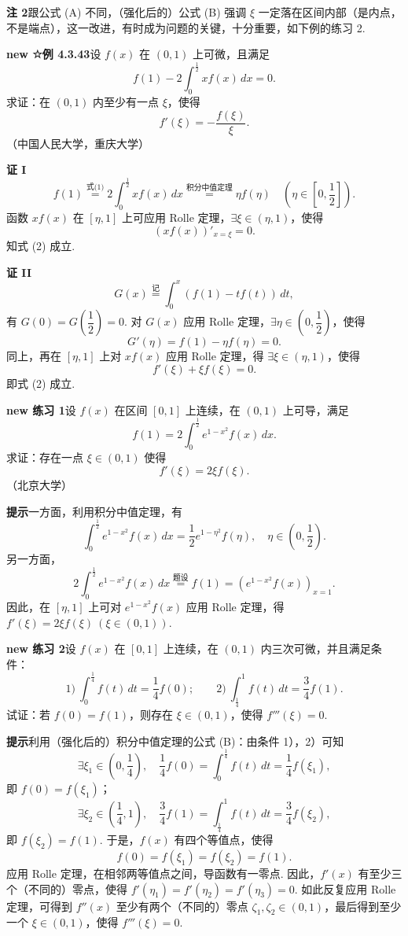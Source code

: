 \documentclass[UTF8,12pt,a4paper,fontset=fandol]{ctexart}
\begin{document}
\noindent\textbf{注 2}\quad 跟公式 (A) 不同，（强化后的）公式 (B) 强调 $\xi$ 一定落在区间内部（是内点，不是端点），这一改进，有时成为问题的关键，十分重要，如下例的练习 2.

\noindent\textbf{new ☆例 4.3.43}\quad 设 $f(x)$ 在 $(0,1)$ 上可微，且满足
\[
f(1)-2\int_0^{\frac12}xf(x)\,dx=0.
\tag{1}
\]
求证：在 $(0,1)$ 内至少有一点 $\xi$，使得
\[
f'(\xi)=-\frac{f(\xi)}{\xi}.
\tag{2}
\]
（中国人民大学，重庆大学）

\noindent\textbf{证 I}\quad
\[
f(1)\stackrel{\text{式(1)}}{=}2\int_0^{\frac12}xf(x)\,dx
\stackrel{\text{积分中值定理}}{=}\eta f(\eta)\quad
\left(\eta\in\left[0,\frac12\right]\right).
\]
函数 $xf(x)$ 在 $[\eta,1]$ 上可应用 Rolle 定理，$\exists\xi\in(\eta,1)$，使得
\[
(xf(x))'_{x=\xi}=0.
\]
知式 (2) 成立.

\noindent\textbf{证 II}\quad
\[
G(x)\stackrel{\text{记}}{=}\int_0^x(f(1)-tf(t))\,dt,
\]
有 $G(0)=G\left(\dfrac12\right)=0$. 对 $G(x)$ 应用 Rolle 定理，$\exists\eta\in\left(0,\dfrac12\right)$，使得
\[
G'(\eta)=f(1)-\eta f(\eta)=0.
\]
同上，再在 $[\eta,1]$ 上对 $xf(x)$ 应用 Rolle 定理，得 $\exists\xi\in(\eta,1)$，使得
\[
f'(\xi)+\xi f(\xi)=0.
\]
即式 (2) 成立.

\noindent\textbf{new 练习 1}\quad 设 $f(x)$ 在区间 $[0,1]$ 上连续，在 $(0,1)$ 上可导，满足
\[
f(1)=2\int_0^{\frac12}e^{1-x^2}f(x)\,dx.
\]
求证：存在一点 $\xi\in(0,1)$ 使得
\[
f'(\xi)=2\xi f(\xi).
\]
（北京大学）

\noindent\textbf{提示}\quad 一方面，利用积分中值定理，有
\[
\int_0^{\frac12}e^{1-x^2}f(x)\,dx=\frac12 e^{1-\eta^2}f(\eta),\quad
\eta\in\left(0,\frac12\right).
\]
另一方面，
\[
2\int_0^{\frac12}e^{1-x^2}f(x)\,dx\stackrel{\text{题设}}{=}f(1)
=\left(e^{1-x^2}f(x)\right)_{x=1}.
\]
因此，在 $[\eta,1]$ 上可对 $e^{1-x^2}f(x)$ 应用 Rolle 定理，得
$f'(\xi)=2\xi f(\xi)\ (\xi\in(0,1))$.

\noindent\textbf{new 练习 2}\quad 设 $f(x)$ 在 $[0,1]$ 上连续，在 $(0,1)$ 内三次可微，并且满足条件：
\[
1)\ \int_0^{\frac14}f(t)\,dt=\frac14f(0);\qquad
2)\ \int_{\frac14}^1f(t)\,dt=\frac34f(1).
\]
试证：若 $f(0)=f(1)$，则存在 $\xi\in(0,1)$，使得 $f'''(\xi)=0$.

\noindent\textbf{提示}\quad 利用（强化后的）积分中值定理的公式 (B)：由条件 1），2）可知
\[
\exists\xi_1\in\left(0,\frac14\right),\quad
\frac14f(0)=\int_0^{\frac14}f(t)\,dt=\frac14f(\xi_1),
\]
即 $f(0)=f(\xi_1)$；
\[
\exists\xi_2\in\left(\frac14,1\right),\quad
\frac34f(1)=\int_{\frac14}^1f(t)\,dt=\frac34f(\xi_2),
\]
即 $f(\xi_2)=f(1)$.
于是，$f(x)$ 有四个等值点，使得
\[
f(0)=f(\xi_1)=f(\xi_2)=f(1).
\]
应用 Rolle 定理，在相邻两等值点之间，导函数有一零点. 因此，$f'(x)$ 有至少三个（不同的）零点，使得
$f'(\eta_1)=f'(\eta_2)=f'(\eta_3)=0$. 如此反复应用 Rolle 定理，可得到 $f''(x)$ 至少有两个（不同的）零点 $\zeta_1,\zeta_2\in(0,1)$，最后得到至少一个 $\xi\in(0,1)$，使得 $f'''(\xi)=0$.
\end{document}
